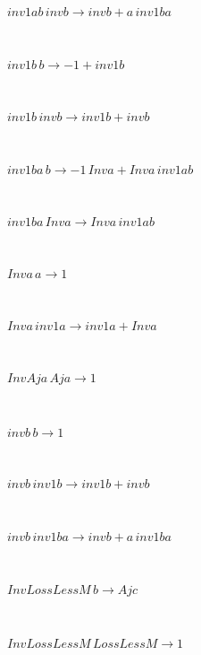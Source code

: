 \begin{minipage}{6in}
$
inv1ab\,
 invb\rightarrow invb + a\,
 inv1ba
$
\end{minipage}\medskip \\
\begin{minipage}{6in}
$
inv1b\,
 b\rightarrow -1 + inv1b
$
\end{minipage}\medskip \\
\begin{minipage}{6in}
$
inv1b\,
 invb\rightarrow inv1b + invb
$
\end{minipage}\medskip \\
\begin{minipage}{6in}
$
inv1ba\,
 b\rightarrow -1\,
 Inva + Inva\,
 inv1ab
$
\end{minipage}\medskip \\
\begin{minipage}{6in}
$
inv1ba\,
 Inva\rightarrow Inva\,
 inv1ab
$
\end{minipage}\medskip \\
\begin{minipage}{6in}
$
Inva\,
 a\rightarrow 1
$
\end{minipage}\medskip \\
\begin{minipage}{6in}
$
Inva\,
 inv1a\rightarrow inv1a + Inva
$
\end{minipage}\medskip \\
\begin{minipage}{6in}
$
InvAja\,
 Aja\rightarrow 1
$
\end{minipage}\medskip \\
\begin{minipage}{6in}
$
invb\,
 b\rightarrow 1
$
\end{minipage}\medskip \\
\begin{minipage}{6in}
$
invb\,
 inv1b\rightarrow inv1b + invb
$
\end{minipage}\medskip \\
\begin{minipage}{6in}
$
invb\,
 inv1ba\rightarrow invb + a\,
 inv1ba
$
\end{minipage}\medskip \\
\begin{minipage}{6in}
$
InvLossLessM\,
 b\rightarrow Ajc
$
\end{minipage}\medskip \\
\begin{minipage}{6in}
$
InvLossLessM\,
 LossLessM\rightarrow 1
$
\end{minipage}\medskip \\
